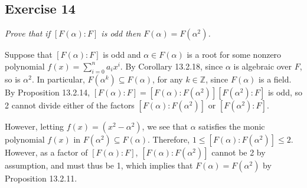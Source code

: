 \subsection*{Exercise 14}
\begin{framed}
\textit{Prove that if $[F(\alpha): F]$ is odd then $F(\alpha) = F(\alpha^2)$.}
\end{framed}

Suppose that $[F(\alpha):F]$ is odd and $\alpha \in F(\alpha)$ is a root for some nonzero polynomial $f(x) = \sum_{i=0}^na_ix^i$. By Corollary 13.2.18, since $\alpha$ is algebraic over $F$, so is $\alpha^2$. In particular, $F(\alpha^k) \subseteq F(\alpha)$, for any $k \in \mathbb{Z}$, since $F(\alpha)$ is a field. By Proposition 13.2.14, $[F(\alpha):F] = [F(\alpha):F(\alpha^2)][F(\alpha^2):F]$ is odd, so 2 cannot divide either of the factors $[F(\alpha):F(\alpha^2)]$ or $[F(\alpha^2):F]$.

However, letting $f(x) = (x^2 - \alpha^2)$, we see that $\alpha$ satisfies the monic polynomial $f(x)$ in $F(\alpha^2) \subseteq F(\alpha)$. Therefore, $1 \le [F(\alpha):F(\alpha^2)] \le 2$. However, as a factor of $[F(\alpha):F]$, $[F(\alpha):F(\alpha^2)]$ cannot be 2 by assumption, and must thus be 1, which implies that $F(\alpha) = F(\alpha^2)$ by Proposition 13.2.11.